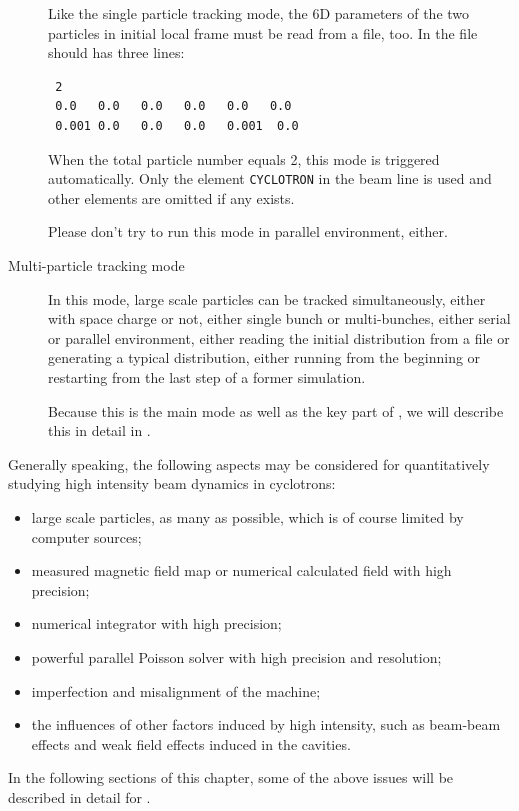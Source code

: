 \begin{description}
  Like the single particle tracking mode,
  the 6D parameters of the two particles in initial local frame must be read from a file, too.
  In the file should has three lines:
\begin{verbatim}
 2
 0.0   0.0   0.0   0.0   0.0   0.0
 0.001 0.0   0.0   0.0   0.001  0.0
\end{verbatim}

When the total particle number equals 2, this mode is triggered automatically.
Only the element \texttt{CYCLOTRON} in the beam line is used and other elements are omitted if any exists.

Please don't try to run this mode in parallel environment, either.


\item[Multi-particle tracking mode]

  In this mode, large scale particles can be tracked simultaneously, either with space charge or not,
  either single bunch or multi-bunches, either serial or parallel environment,
  either reading the initial distribution from a file or generating a typical distribution,
  either running from the beginning or restarting from the last step of a former simulation.

  Because this is the main mode as well as the key part of \opalcycl,
  we will describe this in detail in .

\end{description}

Generally speaking, the following aspects may be considered for quantitatively studying high intensity beam dynamics in cyclotrons:
  \begin{itemize}
  \item large scale particles, as many as possible, which is of course limited by computer sources;
  \item measured magnetic field map or numerical calculated field with high precision;
  \item numerical integrator with high precision;
  \item powerful parallel Poisson solver with high precision and resolution;
  \item imperfection and misalignment of the machine;
  \item the influences of other factors induced by high intensity, such as beam-beam effects and weak field effects induced in the cavities.
  \end{itemize}
  In the following sections of this chapter, some of the above issues will be described in detail for \opalcycl.

